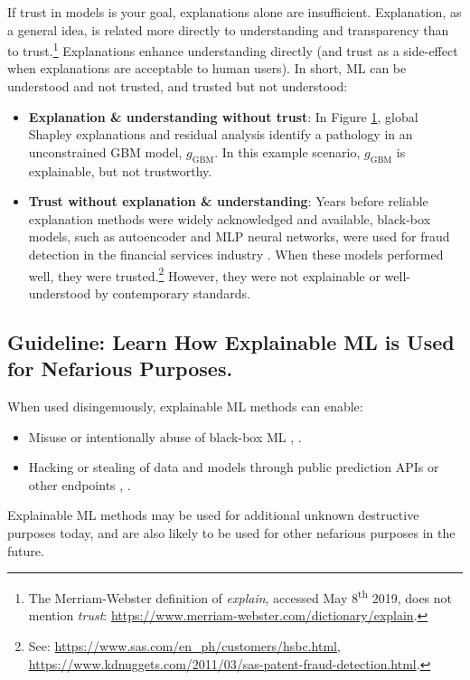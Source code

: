 \documentclass[sigconf]{acmart}
\begin{document}
\begin{figure}[htb!]
	\label{fig:global_shap_resid}
\end{figure}

If trust in models is your goal, explanations alone are insufficient. Explanation, as a general idea, is related more directly to understanding and transparency than to trust.\footnote{The Merriam-Webster definition of \textit{explain}, accessed May 8\textsuperscript{th} 2019, does not mention \textit{trust}: \url{https://www.merriam-webster.com/dictionary/explain}.} Explanations enhance understanding directly (and trust as a side-effect when explanations are acceptable to human users). In short, ML can be understood and not trusted, and trusted but not understood:
\begin{itemize}
\item \textbf{Explanation \& understanding without trust}: In Figure \ref{fig:global_shap_resid}, global Shapley explanations and residual analysis identify a pathology in an unconstrained GBM model, $g_{\text{GBM}}$. In this example scenario, $g_{\text{GBM}}$ is explainable, but not trustworthy. 
\item \textbf{Trust without explanation \& understanding}: Years before reliable explanation methods were widely acknowledged and available, black-box models, such as autoencoder and MLP neural networks, were used for fraud detection in the financial services industry \cite{gopinathan1998fraud}. When these models performed well, they were trusted.\footnote{See: \url{https://www.sas.com/en_ph/customers/hsbc.html}, \url{https://www.kdnuggets.com/2011/03/sas-patent-fraud-detection.html}.} However, they were not explainable or well-understood by contemporary standards.  
\end{itemize}

\subsection{Guideline: Learn How Explainable ML is Used for Nefarious Purposes.} \label{sec:nefarious}

When used disingenuously, explainable ML methods can enable:
\begin{itemize}
\item Misuse or intentionally abuse of black-box ML \cite{fair_washing}, \cite{please_stop}.
\item Hacking or stealing of data and models through public prediction APIs or other endpoints \cite{membership_inference}, \cite{model_stealing}. 
\end{itemize}
\noindent Explainable ML methods may be used for additional unknown destructive purposes today, and are also likely to be used for other nefarious purposes in the future. 
\end{document}
